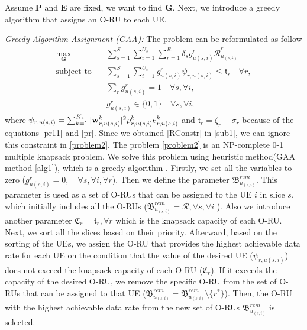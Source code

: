 \documentclass[lettersize,journal]{IEEEtran}
\begin{document}
Assume $\boldsymbol{P}$ and $\boldsymbol{E}$ are fixed, we want to find $\boldsymbol{G}$.
Next, we introduce a greedy algorithm that assigns an O-RU to each UE.

\textit{Greedy Algorithm Assignment (GAA):}
The problem can be reformulated as follow
\begin{subequations}\label{problem2}
\begin{alignat}{4}
\max\limits_{ \boldsymbol{G} }   \quad &  \sum_{s=1}^S\sum_{i=1}^{U_s}\sum_{r=1}^{R} \delta_s g^r_{u(s,i)}\bar{\mathcal{R}}^r_{u_{(s,k)}} \ \\
\text{subject to} \quad  & \sum_{s=1}^{S}\sum_{i=1}^{U_s} g_{u(s,i)}^r \psi_{r,u(s,i)}\leq \mathfrak{t}_r \quad \forall r,
 \label{p11} \\
& \sum_{r}g^r_{u(s,i)} = 1  \quad \forall s,\forall i, \label{p12}\\
 & g^r_{u(s,i)} \in \{0,1\} \quad \forall s,\forall i, \label{p13}
\end{alignat}
\end{subequations}
where $ \psi_{r,u(s,i)}=\sum_{k=1}^{K_s}|\bold{w}_{r,u(s,i)}^{k}|^2 p_{r,u(s,i)}^{k}  e^k_{r,u(s,i)}$
and $\mathfrak{t}_r = \zeta_r- \sigma_r$  because of the equations \eqref{pr11} and \eqref{pr}.
Since we obtained \eqref{RConstr} in \eqref{sub1}, we can ignore this constraint in \eqref{problem2}.
The problem \eqref{problem2} is an NP-complete 0-1 multiple knapsack problem.
We solve this problem using heuristic method(GAA method \ref{alg1}), which is a greedy algorithm \cite{akccay2007greedy,lee2018dynamic}.
Firstly, we set all the variables to zero ($g^r_{u(s,i)} = 0, \quad \forall s, \forall i, \forall r$).
Then we define the parameter ${\mathfrak{B}}^{rem}_{u_{(s,i)}}$. This parameter is used as a set of O-RUs that can be assigned to the UE $i$ in slice $s$, which initially includes all the O-RUs (${\mathfrak{B}}^{rem}_{u_{(s,i)}} = \mathcal{R}, \forall s, \forall i$ ).
Also we introduce another parameter $ \mathfrak{C}_r = \mathfrak{t}_r, \forall r$
which is the knapsack capacity of each O-RU.
Next, we sort all the slices based on their priority.
Afterward, based on the sorting of the UEs,
we assign the O-RU that provides the highest achievable data rate for each UE on the condition that the value of the desired UE ($\psi_{r,u(s,i)}$) does not exceed the knapsack capacity of each O-RU ($ \mathfrak{C}_r$).
If it exceeds the capacity of the desired O-RU, we remove the specific O-RU from the set of O-RUs that can be assigned to that UE (${\mathfrak{B}}^{rem}_{u_{(s,i)}} = {\mathfrak{B}}^{rem}_{u_{(s,i)}} \setminus \{{r^*}\} $). Then, the O-RU with the highest achievable data rate from the new set of O-RUs ${\mathfrak{B}}^{rem}_{u_{(s,i)}}$ is selected.
\end{document}
